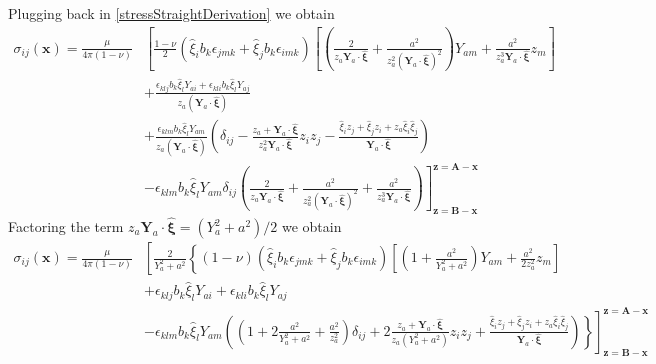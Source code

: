 Plugging back in \eqref{stressStraightDerivation} we obtain
\begin{align}
\sigma_{ij}(\bm x)
=\frac{\mu}{4\pi(1-\nu)}&\left[\frac{1-\nu}{2}\left(\hat{\xi}_ib_k\epsilon_{jmk}+\hat{\xi}_jb_k\epsilon_{imk}\right)\left[\left(\frac{2}{z_a\bm Y_a\cdot \hat{\bm \xi}}+\frac{a^2}{z_a^2(\bm Y_a\cdot \hat{\bm \xi})^2}\right)Y_{am}+\frac{a^2}{z_a^3 \bm Y_a\cdot \hat{\bm \xi}}z_m\right]\right.\nonumber\\
&+\frac{\epsilon_{klj}b_k\hat{\xi}_lY_{ai}+\epsilon_{kli}b_k\hat{\xi}_lY_{aj}}{z_a(\bm Y_a\cdot \hat{\bm \xi})}\nonumber\\
&+\frac{\epsilon_{klm}b_k\hat{\xi}_lY_{am}}{z_a(\bm Y_a\cdot \hat{\bm \xi})}\left(\delta_{ij}-\frac{z_a+\bm Y_a\cdot \hat{\bm \xi}}{z_a^2\bm Y_a\cdot \hat{\bm \xi}}z_iz_j-\frac{\hat{\xi}_iz_j+\hat{\xi}_jz_i+z_a\hat{\xi}_i\hat{\xi}_j}{\bm Y_a\cdot \hat{\bm \xi}}\right)\nonumber\\
&\left.-\epsilon_{klm}b_k\hat{\xi}_lY_{am}\delta_{ij}\left(\frac{2}{z_a\bm Y_a\cdot \hat{\bm \xi}}+\frac{a^2}{z_a^2(\bm Y_a\cdot \hat{\bm \xi})^2}+\frac{a^2}{z_a^3 \bm Y_a\cdot \hat{\bm \xi}}\right)\right]^{\bm z=\bm A-\bm x}_{\bm z=\bm B-\bm x}
\end{align}
Factoring the term $z_a\bm Y_a\cdot \hat{\bm \xi}=(Y_a^2+a^2)/2$ we obtain
\begin{align}
\sigma_{ij}(\bm x)
=\frac{\mu}{4\pi(1-\nu)}&\left[\frac{2}{Y_a^2+a^2}\left\{(1-\nu)\left(\hat{\xi}_ib_k\epsilon_{jmk}+\hat{\xi}_jb_k\epsilon_{imk}\right)\left[\left(1+\frac{a^2}{Y_a^2+a^2}\right)Y_{am}+\frac{a^2}{2z_a^2 }z_m\right]\right.\right.\nonumber\\
&+\epsilon_{klj}b_k\hat{\xi}_lY_{ai}+\epsilon_{kli}b_k\hat{\xi}_lY_{aj}\nonumber\\
&\left.\left.-\epsilon_{klm}b_k\hat{\xi}_lY_{am}\left(\left(1+2\frac{a^2}{Y_a^2+a^2}+\frac{a^2}{z_a^2 }\right)\delta_{ij}+2\frac{z_a+\bm Y_a\cdot \hat{\bm \xi}}{z_a(Y_a^2+a^2)}z_iz_j+\frac{\hat{\xi}_iz_j+\hat{\xi}_jz_i+z_a\hat{\xi}_i\hat{\xi}_j}{\bm Y_a\cdot \hat{\bm \xi}}\right)
\right\}\right]^{\bm z=\bm A-\bm x}_{\bm z=\bm B-\bm x}
%
\end{align}


